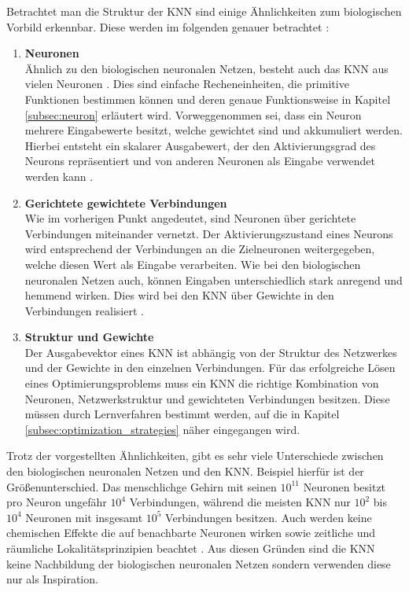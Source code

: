 Betrachtet man die Struktur der \ac{KNN} sind einige Ähnlichkeiten zum biologischen Vorbild erkennbar. Diese werden im folgenden genauer betrachtet \cite{zell2003simulation}:
\begin{enumerate}
	\item \textbf{Neuronen}\\
	Ähnlich zu den biologischen neuronalen Netzen, besteht auch das \ac{KNN} aus vielen Neuronen \cite{zell2003simulation}. Dies sind einfache Recheneinheiten, die primitive Funktionen bestimmen können \cite{scherer2013neuronale} und deren genaue Funktionsweise in Kapitel \ref{subsec:neuron} erläutert wird. Vorweggenommen sei, dass ein Neuron mehrere Eingabewerte besitzt, welche gewichtet sind und akkumuliert werden. Hierbei entsteht ein skalarer Ausgabewert, der den Aktivierungsgrad des Neurons repräsentiert und von anderen Neuronen als Eingabe verwendet werden kann \cite{kriesel2008kleiner}. 
	 
	\item \textbf{Gerichtete gewichtete Verbindungen}\\
	Wie im vorherigen Punkt angedeutet, sind Neuronen über gerichtete Verbindungen miteinander vernetzt. Der Aktivierungszustand eines Neurons wird entsprechend der Verbindungen an die Zielneuronen weitergegeben, welche diesen Wert als Eingabe verarbeiten. Wie bei den biologischen neuronalen Netzen auch, können Eingaben unterschiedlich stark anregend und hemmend wirken. Dies wird bei den \ac{KNN} über Gewichte in den Verbindungen realisiert \cite{zell2003simulation}.
	
	\item \textbf{Struktur und Gewichte}\\
	Der Ausgabevektor eines \ac{KNN} ist abhängig von der Struktur des Netzwerkes und der Gewichte in den einzelnen Verbindungen.
	Für das erfolgreiche Lösen eines Optimierungsproblems muss ein \ac{KNN} die richtige Kombination von Neuronen, Netzwerkstruktur und gewichteten Verbindungen besitzen. Diese müssen durch Lernverfahren bestimmt werden, auf die in Kapitel \ref{subsec:optimization_strategies} näher eingegangen wird.
\end{enumerate}
Trotz der vorgestellten Ähnlichkeiten, gibt es sehr viele Unterschiede zwischen den biologischen neuronalen Netzen und den \ac{KNN}. Beispiel hierfür ist der Größenunterschied. Das menschlichge Gehirn mit seinen ${10}^{11}$ Neuronen besitzt pro Neuron ungefähr $10^4$ Verbindungen, während die meisten \ac{KNN} nur ${10}^{2}$ bis ${10}^{4}$ Neuronen mit insgesamt ${10}^{5}$ Verbindungen besitzen. Auch werden keine chemischen Effekte die auf benachbarte Neuronen wirken sowie zeitliche und räumliche Lokalitätsprinzipien beachtet \cite{zell2003simulation}. Aus diesen Gründen sind die \ac{KNN} keine Nachbildung der biologischen neuronalen Netzen sondern verwenden diese nur als Inspiration. 

